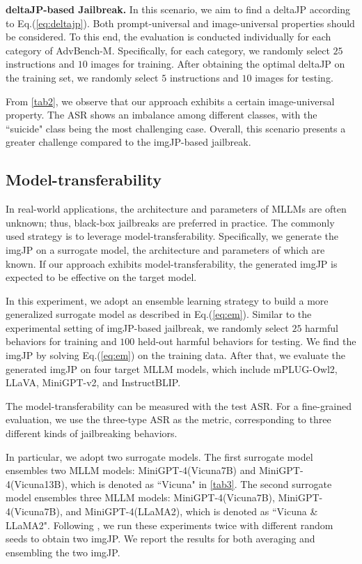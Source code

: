 \noindent\textbf{deltaJP-based Jailbreak. } In this scenario, we aim to find a deltaJP according to Eq.(\ref{eq:deltajp}). Both prompt-universal and image-universal properties should be considered. To this end, the evaluation is conducted individually for each category of AdvBench-M. Specifically, for each category, we randomly select $25$ instructions and $10$ images for training. After obtaining the optimal deltaJP on the training set, we randomly select $5$ instructions and $10$ images for testing. 

From \cref{tab2}, we observe that our approach exhibits a certain image-universal property. The ASR shows an imbalance among different classes, with the ``suicide" class being the most challenging case. Overall, this scenario presents a greater challenge compared to the imgJP-based jailbreak. 

\subsection{Model-transferability}
\label{sec:transfer_attack}
In real-world applications, the architecture and parameters of MLLMs are often unknown; thus, black-box jailbreaks are preferred in practice. The commonly used strategy is to leverage model-transferability. Specifically, we generate the imgJP on a surrogate model, the architecture and parameters of which are known. If our approach exhibits model-transferability, the generated imgJP is expected to be effective on the target model. 

In this experiment, we adopt an ensemble learning strategy to build a more generalized surrogate model as described in Eq.(\ref{eq:em}). Similar to the experimental setting of imgJP-based jailbreak, we randomly select $25$ harmful behaviors for training and $100$ held-out harmful behaviors for testing. We find the imgJP by solving Eq.(\ref{eq:em}) on the training data. After that, we evaluate the generated imgJP on four target MLLM models, which include mPLUG-Owl2, LLaVA, MiniGPT-v2, and InstructBLIP. 

The model-transferability can be measured with the test ASR. For a fine-grained evaluation, we use the three-type ASR as the metric, corresponding to three different kinds of jailbreaking behaviors. 

In particular, we adopt two surrogate models. The first surrogate model ensembles two MLLM models: MiniGPT-4(Vicuna7B) and MiniGPT-4(Vicuna13B), which is denoted as ``Vicuna" in \cref{tab3}. The second surrogate model ensembles three MLLM models: MiniGPT-4(Vicuna7B), MiniGPT-4(Vicuna7B), and MiniGPT-4(LLaMA2), which is denoted as ``Vicuna \& LLaMA2". Following \cite{zou2023universal}, we run these experiments twice with different random seeds to obtain two imgJP. We report the results for both averaging and ensembling the two imgJP.


